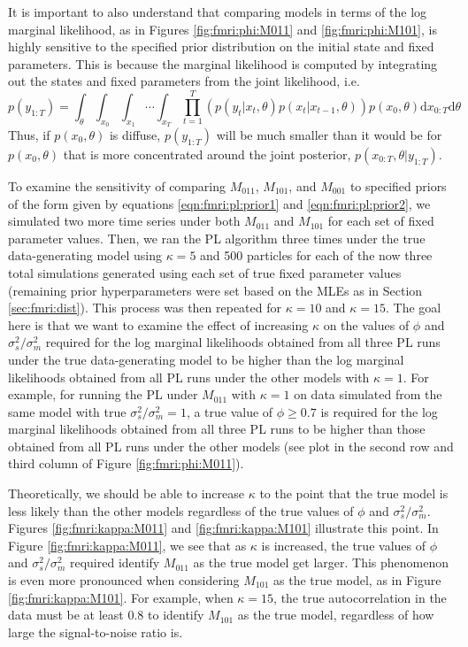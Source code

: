 It is important to also understand that comparing models in terms of the log marginal likelihood, as in Figures \ref{fig:fmri:phi:M011} and \ref{fig:fmri:phi:M101}, is highly sensitive to the specified prior distribution on the initial state and fixed parameters. This is because the marginal likelihood is computed by integrating out the states and fixed parameters from the joint likelihood, i.e.
\begin{equation}
p(y_{1:T}) = \int_{\theta} \int_{x_0} \int_{x_1} \cdots \int_{x_T} \prod_{t=1}^T\left(p(y_t|x_t,\theta)p(x_t|x_{t-1},\theta)\right)p(x_0,\theta)\mbox{d}x_{0:T}\mbox{d}\theta \label{eqn:int:marg}
\end{equation}
Thus, if $p(x_0,\theta)$ is diffuse, $p(y_{1:T})$ will be much smaller than it would be for $p(x_0,\theta)$ that is more concentrated around the joint posterior, $p(x_{0:T},\theta|y_{1:T})$.

To examine the sensitivity of comparing $M_{011}$, $M_{101}$, and $M_{001}$ to specified priors of the form given by equations \eqref{eqn:fmri:pl:prior1} and \eqref{eqn:fmri:pl:prior2}, we simulated two more time series under both $M_{011}$ and $M_{101}$ for each set of fixed parameter values. Then, we ran the PL algorithm three times under the true data-generating model using $\kappa = 5$ and 500 particles for each of the now three total simulations generated using each set of true fixed parameter values (remaining prior hyperparameters were set based on the MLEs as in Section \ref{sec:fmri:dist}). This process was then repeated for $\kappa = 10$ and $\kappa = 15$. The goal here is that we want to examine the effect of increasing $\kappa$ on the values of $\phi$ and $\sigma^2_s / \sigma^2_m$ required for the log marginal likelihoods obtained from all three PL runs under the true data-generating model to be higher than the log marginal likelihoods obtained from all PL runs under the other models with $\kappa = 1$. For example, for running the PL under $M_{011}$ with $\kappa = 1$ on data simulated from the same model with true $\sigma^2_s / \sigma^2_m = 1$, a true value of $\phi \ge 0.7$ is required for the log marginal likelihoods obtained from all three PL runs to be higher than those obtained from all PL runs under the other models (see plot in the second row and third column of Figure \ref{fig:fmri:phi:M011}).

Theoretically, we should be able to increase $\kappa$ to the point that the true model is less likely than the other models regardless of the true values of $\phi$ and $\sigma^2_s / \sigma^2_m$. Figures \ref{fig:fmri:kappa:M011} and \ref{fig:fmri:kappa:M101} illustrate this point. In Figure \ref{fig:fmri:kappa:M011}, we see that as $\kappa$ is increased, the true values of $\phi$ and $\sigma^2_s / \sigma^2_m$ required identify $M_{011}$ as the true model get larger. This phenomenon is even more pronounced when considering $M_{101}$ as the true model, as in Figure \ref{fig:fmri:kappa:M101}. For example, when $\kappa = 15$, the true autocorrelation in the data must be at least 0.8 to identify $M_{101}$ as the true model, regardless of how large the signal-to-noise ratio is.

